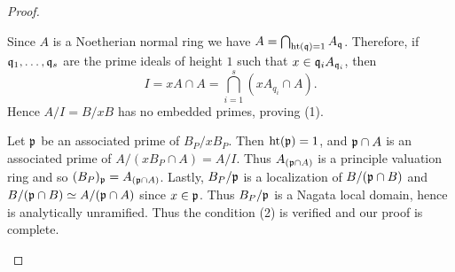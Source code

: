 \documentclass[../main]{subfiles}
\begin{document}
\begin{proof}
\begin{enumerate}
Since $A$ is a Noetherian normal ring we have $A=\bigcap_{\operatorname{ht}(\mathfrak{q})=1} A_{\mathfrak{q}}$. Therefore, if $\mathfrak{q}_{1}, \dots, \mathfrak{q}_{s}$ are the prime ideals of height $1$ such that $x \in \mathfrak{q}_{i} A_{\mathfrak{q}_{i}}$, then \[I=x A \cap A=\bigcap_{i=1}^{s}(x A_{q_{i}} \cap A).\] Hence $A / I=B / x B$ has no embedded primes, proving (1).

Let $\mathfrak{p}$ be an associated prime of $B_P/xB_P$. Then $\operatorname{ht}(\mathfrak{p})=1$, and $\mathfrak{p}\cap A$ is an associated prime of $A/(xB_P\cap A) = A/I$. Thus $A_{(\mathfrak{p}\cap A)}$ is a principle valuation ring and so $(B_P)_{\mathfrak{p}} = A_{(\mathfrak{p}\cap A)}$. Lastly, $B_P/\mathfrak{p}$ is a localization of $B/(\mathfrak{p}\cap B)$ and $B/(\mathfrak{p}\cap B) \simeq A/(\mathfrak{p}\cap A)$ since $x\in \mathfrak{p}$. Thus $B_P/\mathfrak{p}$ is a Nagata local domain, hence is analytically unramified. Thus the condition (2) is verified and our proof is complete.
\end{enumerate}\end{proof}
\end{document}
